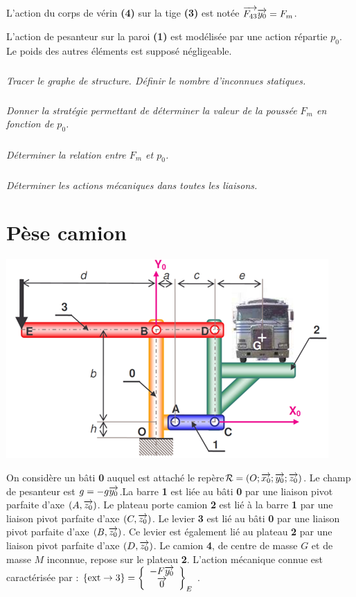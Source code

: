 \documentclass[10pt,fleqn]{article} %
\begin{document}
\begin{multicols}{2}
L'action du corps de vérin \textbf{(4)} sur la tige \textbf{(3)} est notée $\overrightarrow{F_{43}}\overrightarrow{y_0}=F_m$.

L'action de pesanteur sur la paroi \textbf{(1)} est modélisée par une action répartie $p_0$. Le poids des autres éléments est supposé négligeable.

\subparagraph{}\textit{Tracer le graphe de structure. Définir le nombre d'inconnues statiques.}

\subparagraph{}\textit{Donner la stratégie permettant de déterminer la valeur de la poussée $F_m$ en fonction de $p_0$.}

\subparagraph{}\textit{Déterminer la relation entre $F_m$ et $p_0$.}

\subparagraph{}\textit{Déterminer les actions mécaniques dans toutes les liaisons.}


\section*{Pèse camion}

\begin{center}
\includegraphics[width=.9\linewidth]{images/fig_05}
\end{center}

\setcounter{exo}{0}
On considère un bâti \textbf{0} auquel est attaché le repère$\mathcal{R}=\left(O;\overrightarrow{x_0};\overrightarrow{y_0};\overrightarrow{z_0} \right)$. Le champ de pesanteur est $g=-g\overrightarrow{y_0}$.La barre \textbf{1} est liée au bâti \textbf{0} par une liaison pivot parfaite d’axe $\left(A,\overrightarrow{z_0}\right)$. Le plateau porte camion \textbf{2} est lié à la barre \textbf{1} par une liaison pivot parfaite d’axe $\left(C,\overrightarrow{z_0}\right)$. Le levier \textbf{3} est lié au bâti \textbf{0} par une liaison pivot parfaite d’axe $\left(B,\overrightarrow{z_0}\right)$. Ce levier est également lié au plateau \textbf{2} par une liaison pivot parfaite d’axe $\left(D,\overrightarrow{z_0}\right)$. Le camion \textbf{4}, de centre de masse $G$ et de masse $M$ inconnue, repose sur le plateau \textbf{2}.
L’action mécanique connue est caractérisée par : $\{\text{ext}\rightarrow 3\}=\left\{
\begin{array}{c}
-F\overrightarrow{y_0} \\
\overrightarrow{0} \\
\end{array}
\right\}_E$ .





\end{multicols}
\end{document}
